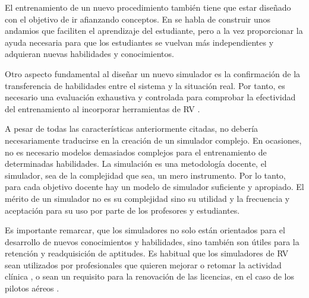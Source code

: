 El entrenamiento de un nuevo procedimiento también tiene que estar diseñado con el objetivo de ir afianzando conceptos. En \cite{olson2014jerome} se habla de construir unos andamios que faciliten el aprendizaje del estudiante, pero a la vez proporcionar la ayuda necesaria para que los estudiantes se vuelvan más independientes y adquieran nuevas habilidades y conocimientos.



Otro aspecto fundamental al diseñar un nuevo simulador es la confirmación de la transferencia de habilidades entre el sistema y la situación real. Por tanto, es necesario una evaluación exhaustiva y controlada para comprobar la efectividad del entrenamiento al incorporar herramientas de \ac{RV} \cite{AIM2016224}.

A pesar de todas las características anteriormente citadas, no debería  necesariamente traducirse en la creación de un simulador complejo. En ocasiones, no es necesario modelos demasiados complejos para el entrenamiento de determinadas habilidades. La simulación es una metodología docente, el simulador, sea de la complejidad que sea, un mero instrumento. Por lo tanto, para cada objetivo docente hay un modelo de simulador suficiente y apropiado. El mérito de un simulador no es su complejidad sino su utilidad y la frecuencia y aceptación para su uso por parte de los profesores y estudiantes.

Es importante remarcar, que los simuladores no solo están orientados para el desarrollo de nuevos conocimientos y habilidades, sino también son útiles para la retención y readquisición de aptitudes. Es habitual que los simuladores de \ac{RV} sean utilizados por profesionales que quieren mejorar o retomar la actividad clínica \cite{Atesok}, o sean un requisito para la renovación de las licencias, en el caso de los pilotos aéreos \cite{normativa}. 

